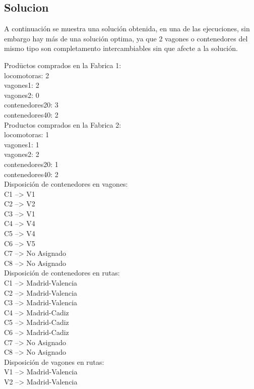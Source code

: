 \documentclass[11pt,spanish]{article}
\begin{document}
		\subsection{Solucion}
		A continuación se muestra una solución obtenida, en una de las ejecuciones, sin embargo hay más de una solución optima, ya que 2 vagones o contenedores del mismo tipo son completamento intercambiables sin que afecte a la solución.
		\begin{tabbing}
		Prod\=uctos comprados en la Fabrica 1:\\
		\>	locomotoras: 2\\
		\>	vagones1: 2\\
		\>	vagones2: 0\\
		\>	contenedores20: 3\\
		\>	contenedores40: 2\\
		Productos comprados en la Fabrica 2:\\
		\>	locomotoras: 1\\
		\>	vagones1: 1\\
		\>	vagones2: 2\\
		\>	contenedores20: 1\\
		\>	contenedores40: 2\\
		Disposición de contenedores en vagones:\\
		\>	C1 --> V1\\
		\>	C2 --> V2\\
		\>	C3 --> V1\\
		\>	C4 --> V4\\
		\>	C5 --> V4\\
		\>	C6 --> V5\\
		\>	C7 --> No Asignado\\
		\>	C8 --> No Asignado\\
		Disposición de contenedores en rutas:\\
		\>	C1 --> Madrid-Valencia\\
		\>	C2 --> Madrid-Valencia\\
		\>	C3 --> Madrid-Valencia\\
		\>	C4 --> Madrid-Cadiz\\
		\>	C5 --> Madrid-Cadiz\\
		\>	C6 --> Madrid-Cadiz\\
		\>	C7 --> No Asignado\\
		\>	C8 --> No Asignado\\
		Disposición de vagones en rutas:\\
		\>	V1 --> Madrid-Valencia\\
		\>	V2 --> Madrid-Valencia\\

\end{tabbing}
\end{document}
